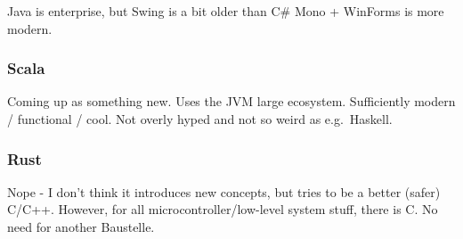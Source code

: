 Java is enterprise, but Swing is a bit older than C\# Mono + WinForms is more modern.

\subsubsection{Scala}\label{scala}

Coming up as something new. Uses the JVM large ecosystem. Sufficiently modern / functional / cool. Not overly hyped and not so weird as e.g.~Haskell.

\subsubsection{Rust}\label{rust}

Nope - I don't think it introduces new concepts, but tries to be a better (safer) C/C++. However, for all microcontroller/low-level system stuff, there is C. No need for another Baustelle.
